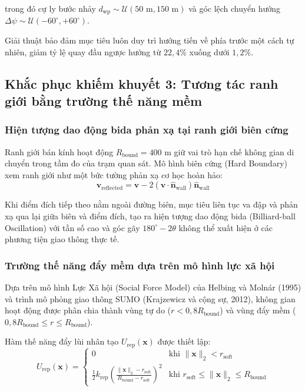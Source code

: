 trong đó cự ly bước nhảy $d_{\text{wp}} \sim \mathcal{U}(50\text{ m}, 150\text{ m})$ và góc lệch chuyển hướng $\Delta\psi \sim \mathcal{U}(-60^\circ, +60^\circ)$.

Giải thuật bảo đảm mục tiêu luôn duy trì hướng tiến về phía trước một cách tự nhiên, giảm tỷ lệ quay đầu ngược hướng từ $22{,}4\%$ xuống dưới $1{,}2\%$.

\subsection{Khắc phục khiếm khuyết 3: Tương tác ranh giới bằng trường thế năng mềm}

\subsubsection{Hiện tượng dao động bida phản xạ tại ranh giới biên cứng}

\hspace{0.5cm} Ranh giới bán kính hoạt động $R_{\text{bound}} = 400$ m giữ vai trò hạn chế không gian di chuyển trong tầm đo của trạm quan sát. Mô hình biên cứng (Hard Boundary) xem ranh giới như một bức tường phản xạ cơ học hoàn hảo:
\begin{equation}
\mathbf{v}_{\text{reflected}} = \mathbf{v} - 2(\mathbf{v} \cdot \hat{\mathbf{n}}_{\text{wall}}) \hat{\mathbf{n}}_{\text{wall}}
\label{eq:specular-reflection-law}
\end{equation}

Khi điểm đích tiếp theo nằm ngoài đường biên, mục tiêu liên tục va đập và phản xạ qua lại giữa biên và điểm đích, tạo ra hiện tượng dao động bida (Billiard-ball Oscillation) với tần số cao và góc gãy $180^\circ - 2\theta$ không thể xuất hiện ở các phương tiện giao thông thực tế.

\subsubsection{Trường thế năng đẩy mềm dựa trên mô hình lực xã hội}

\hspace{0.5cm} Dựa trên mô hình Lực Xã hội (Social Force Model) của Helbing và Molnár (1995) và trình mô phỏng giao thông SUMO (Krajzewicz và cộng sự, 2012), không gian hoạt động được phân chia thành vùng tự do ($r < 0{,}8 R_{\text{bound}}$) và vùng đẩy mềm ($0{,}8 R_{\text{bound}} \le r \le R_{\text{bound}}$).

Hàm thế năng đẩy lùi nhân tạo $U_{\text{rep}}(\mathbf{x})$ được thiết lập:
\begin{equation}
U_{\text{rep}}(\mathbf{x}) = \begin{cases}
0 & \text{khi } \|\mathbf{x}\|_2 < r_{\text{soft}} \\
\frac{1}{2} k_{\text{rep}} \left( \frac{\|\mathbf{x}\|_2 - r_{\text{soft}}}{R_{\text{bound}} - r_{\text{soft}}} \right)^2 & \text{khi } r_{\text{soft}} \le \|\mathbf{x}\|_2 \le R_{\text{bound}}
\end{cases}
\label{eq:soft-repulsion-potential-field}
\end{equation}

